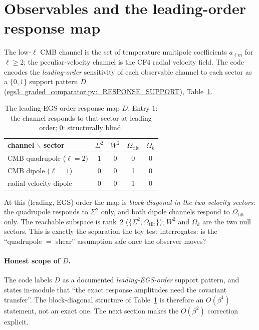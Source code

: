 \documentclass[11pt]{article}
\newcommand{\pathx}[1]{{\small\urlstyle{tt}\url{#1}}}  %
\newcommand{\Sig}{\Sigma^2}
\newcommand{\Wsq}{W^2}
\newcommand{\Otilt}{\Omega_{\mathrm{tilt}}}
\newcommand{\Ok}{\Omega_{k}}
\newcommand{\alm}{a_{\ell m}}
\begin{document}
\section{Observables and the leading-order response map}
\label{sec:response}

The low-$\ell$ CMB channel is the set of temperature multipole coefficients
$\alm$ for $\ell\ge 2$; the peculiar-velocity channel is the CF4 radial
velocity field. The code encodes the \emph{leading-order} sensitivity of each
observable channel to each sector as a $\{0,1\}$ support pattern $D$
(\pathx{egs3_graded_comparator.py:_RESPONSE_SUPPORT}), Table~\ref{tab:D}.

\begin{table}[htbp]\centering\small
\caption{The leading-EGS-order response map $D$. Entry $1$: the channel responds
to that sector at leading order; $0$: structurally blind.}
\label{tab:D}
\begin{tabular}{@{}lcccc@{}}
\toprule
channel $\backslash$ sector & $\Sig$ & $\Wsq$ & $\Otilt$ & $\Ok$ \\
\midrule
CMB quadrupole ($\ell{=}2$)   & 1 & 0 & 0 & 0 \\
CMB dipole ($\ell{=}1$)       & 0 & 0 & 1 & 0 \\
radial-velocity dipole        & 0 & 0 & 1 & 0 \\
\bottomrule
\end{tabular}
\end{table}

At this (leading, EGS) order the map is \emph{block-diagonal in the two velocity
sectors}: the quadrupole responds to $\Sig$ only, and both dipole channels
respond to $\Otilt$ only. The reachable subspace is rank~2
($\{\Sig,\Otilt\}$); $\Wsq$ and $\Ok$ are the two null sectors. This is exactly
the separation the toy test interrogates: is the ``quadrupole $=$ shear''
assumption safe once the observer moves?

\paragraph{Honest scope of $D$.} The code labels $D$ as a documented
\emph{leading-EGS-order} support pattern, and states in-module that ``the exact
response amplitudes need the covariant transfer''. The block-diagonal structure
of Table~\ref{tab:D} is therefore an $O(\beta^1)$ statement, not an exact one. The
next section makes the $O(\beta^2)$ correction explicit.
\end{document}
